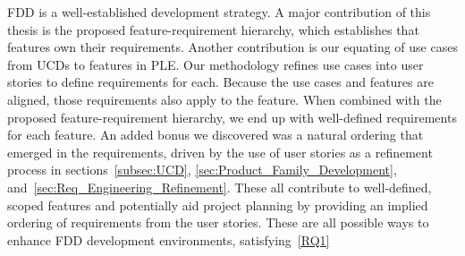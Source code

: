 



\gls{FDD} is a well-established development strategy. A major contribution of this thesis is the proposed feature-requirement hierarchy, which establishes that features own their requirements. Another contribution is our equating of use cases from \gls{UCD}s to features in \gls{PLE}. Our methodology refines use cases into user stories to define requirements for each. Because the use cases and features are aligned, those requirements also apply to the feature. When combined with the proposed feature-requirement hierarchy, we end up with well-defined requirements for each feature. An added bonus we discovered was a natural ordering that emerged in the requirements, driven by the use of user stories as a refinement process in sections~\ref{subsec:UCD}, \ref{sec:Product_Family_Development}, and~\ref{sec:Req_Engineering_Refinement}. These all contribute to well-defined, scoped features and potentially aid project planning by providing an implied ordering of requirements from the user stories. These are all possible ways to enhance \gls{FDD} development environments, satisfying~\ref{RQ1}




